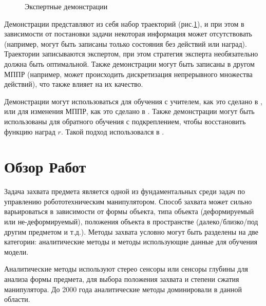 \documentclass{mipt-thesis-bs}
\begin{document}
\begin{figure}[ht]
    \centering
    \vspace{-0.2cm}
    \caption{Экспертные демонстрации}
    \label{demo}
\end{figure}

Демонстрации представляют из себя набор траекторий (рис.\ref{demo}), и при этом в зависимости от постановки задачи некоторая информация может отсутствовать (например, могут быть записаны только состояния без действий или наград). Траектории записываются экспертом, при этом стратегия эксперта необязательно должна быть оптимальной. Также демонстрации могут быть записаны в другом МППР (например, может происходить дискретизация непрерывного множества действий), что также влияет на их качество.

Демонстрации могут использоваться для обучения с учителем, как это сделано в \cite{dqfd}, или для изменения МППР, как это сделано в \cite{pofd}. Также демонстрации могут быть использованы для обратного обучения с подкреплением, чтобы восстановить функцию наград $r$. Такой подход использовался в \cite{gail}.   

\chapter{Обзор Работ}

Задача захвата предмета является одной из фундаментальных среди задач по управлению робототехническим манипулятором. Способ захвата может сильно варьироваться в зависимости от формы объекта, типа объекта (деформируемый или не-деформируемый), положения объекта в пространстве (далеко/близко/под другим предметом и т.д.). Методы захвата условно могут быть разделены на две категории: аналитические методы и методы использующие данные для обучения модели. 

Аналитические методы используют стерео сенсоры или сенсоры глубины для анализа формы предмета, для выбора положения захвата и степени сжатия манипулятора. До 2000 года аналитические методы доминировали в данной области.
\end{document}
